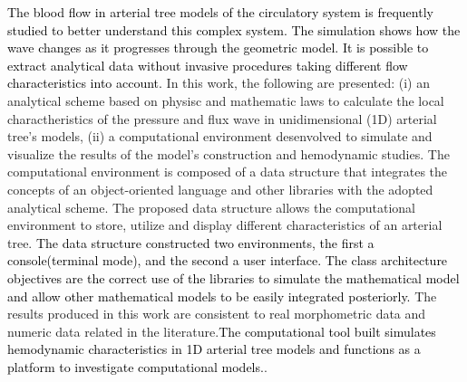 \documentclass[msc,divps,pdftex]{mmc}
\newcommand{\igunew}[1]{\textcolor{black}{#1}}
\begin{document}
\begin{foreignabstract}
	\justifying
	\igunew{The blood flow in arterial tree models of the circulatory system is frequently studied to better understand this complex system. The simulation shows how the wave changes as it progresses through the geometric model. It is possible to extract analytical data without invasive procedures taking different flow characteristics into account.}
	In this work, the following are presented: (i) an analytical scheme based on physisc and mathematic laws to calculate the local charactheristics of the pressure and flux wave in unidimensional (1D) arterial tree's models, (ii) a computational environment desenvolved to simulate and visualize the results of the model's construction and hemodynamic studies. 
	The computational environment is composed of a data structure that integrates the concepts of an object-oriented language and other libraries with the adopted analytical scheme.
	The proposed data structure allows the computational environment to store, utilize and display different characteristics of an arterial tree. \igunew{The data structure constructed two environments, the first a console(terminal mode), and the second a user interface. The class architecture objectives are the correct use of the libraries to simulate the mathematical model and allow other mathematical models to be easily integrated posteriorly.}
	The results produced in this work are consistent to real morphometric data and numeric data related in the literature.\igunew{The computational tool built simulates hemodynamic characteristics in 1D arterial tree models and functions as a platform to investigate computational models.}.
\end{foreignabstract}





\listoffigures  %
\listoftables


\tableofcontents




\mainmatter


%
%
%
 
\end{document}
